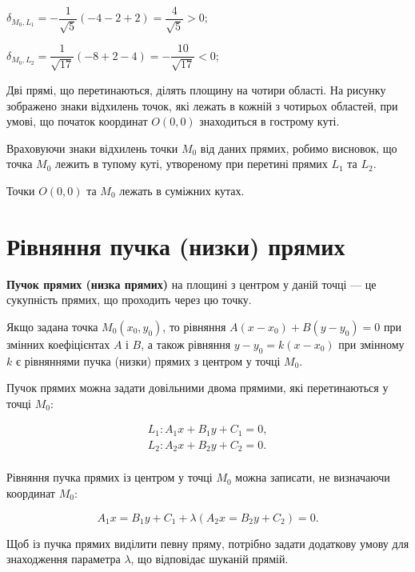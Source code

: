 \begin{solution}
{}
	\parbox{9.3cm}{
		$\delta_{M_0,L_1} = -\dfrac{1}{\sqrt{5}}(-4 -2 +2) = \dfrac{4}{\sqrt{5}} > 0;$
	
		$\delta_{M_0,L_2} = \dfrac{1}{\sqrt{17}}(-8 +2 -4) = -\dfrac{10}{\sqrt{17}} < 0;$
	
		Дві прямі, що перетинаються, ділять площину на
		чотири області. На рисунку зображено знаки відхилень
		точок, які лежать в кожній з чотирьох областей, при умові, що початок координат
		$O(0,0)$ знаходиться в гострому куті.
	}
	
	Враховуючи знаки відхилень точки $M_0$ від даних прямих, робимо висновок,
	що точка $M_0$ лежить в тупому куті, утвореному при перетині прямих $L_1$ та $L_2$.
	
	Точки $O(0,0)$ та $M_0$ лежать в суміжних кутах. 
\end{solution}

\section{Рівняння пучка (низки) прямих}

\begin{definition}
	\textbf{Пучок прямих (низка прямих)} на площині з центром у даній точці --- це  
	сукупність прямих, що проходить через цю точку.
\end{definition}

Якщо задана точка $M_0(x_0,y_0)$, то рівняння $A(x - x_0) + B(y - y_0) = 0$ при
змінних коефіцієнтах $A$ і $B$, а також рівняння $y-y_0 = k(x-x_0)$ при змінному $k$
є рівняннями пучка (низки) прямих з центром у точці $M_0$.

Пучок прямих можна задати довільними двома прямими, які перетинаються у
точці $M_0$:

$$\begin{array}{l}
	L_1: A_1x + B_1y + C_1 = 0,\\
	L_2: A_2x + B_2y + C_2 = 0.\\
\end{array}$$

Рівняння пучка прямих із центром у точці $M_0$ можна записати, не визначаючи
координат $M_0$:

$$A_1x = B_1y + C_1 + \lambda(A_2x = B_2y + C_2) = 0.$$

Щоб із пучка прямих виділити певну пряму, потрібно задати додаткову умову
для знаходження параметра $\lambda$, що відповідає шуканій прямій. 

